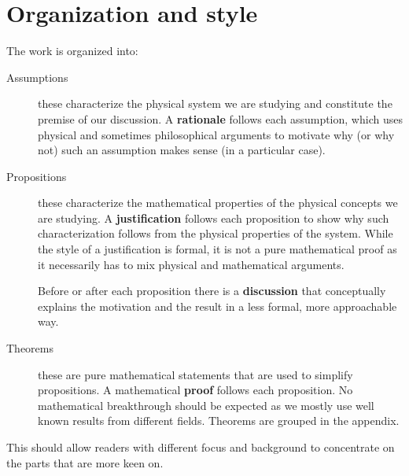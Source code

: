 \documentclass[aps,pra,10pt,twocolumn,floatfix,nofootinbib]{revtex4-1}
\numberwithin{equation}{section}
\theoremstyle{definition}
\begin{document}


\section{Organization and style}

The work is organized into:
\begin{description}
  \item[Assumptions] these characterize the physical system we are studying and constitute the premise of our discussion. A \textbf{rationale} follows each assumption, which uses physical and sometimes philosophical arguments to motivate why (or why not) such an assumption makes sense (in a particular case).
  \item[Propositions] these characterize the mathematical properties of the physical concepts we are studying. A \textbf{justification} follows each proposition to show why such characterization follows from the physical properties of the system. While the style of a justification is formal, it is not a pure mathematical proof as it necessarily has to mix physical and mathematical arguments.
  
  Before or after each proposition there is a \textbf{discussion} that conceptually explains the motivation and the result in a less formal, more approachable way.
  
  \item[Theorems] these are pure mathematical statements that are used to simplify propositions. A mathematical \textbf{proof} follows each proposition. No mathematical breakthrough should be expected as we mostly use well known results from different fields. Theorems are grouped in the appendix.
\end{description}
This should allow readers with different focus and background to concentrate on the parts that are more keen on.
\end{document}

